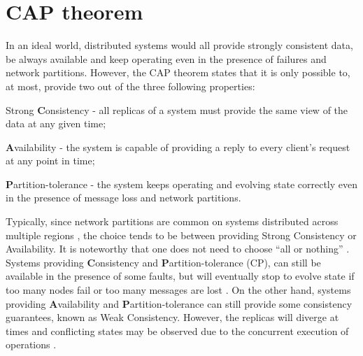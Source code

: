 

\section{CAP theorem}
\label{sec:cap}


In an ideal world, distributed systems would all provide strongly consistent data, be always available and keep operating even in the presence of failures and network partitions.
However, the CAP theorem \cite{cap} states that it is only possible to, at most, provide two out of the three following properties:
\begin{enumerate*}[label=(\roman*)]
	\item Strong \textbf{C}onsistency - all replicas of a system must provide the same view of the data at any given time;
	\item \textbf{A}vailability - the system is capable of providing a reply to every client's request at any point in time;
	\item \textbf{P}artition-tolerance - the system keeps operating and evolving state correctly even in the presence of message loss and network partitions.
\end{enumerate*}

Typically, since network partitions are common on systems distributed across multiple regions \cite{understandingEC}, the choice tends to be between providing Strong Consistency or Availability.
It is noteworthy that one does not need to choose ``all or nothing'' \cite{understandingEC}. 
Systems providing \textbf{C}onsistency and \textbf{P}artition-tolerance (CP), can still be available in the presence of some faults, but will eventually stop to evolve state if too many nodes fail or too many messages are lost \cite{cap}.
On the other hand, systems providing \textbf{A}vailability and \textbf{P}artition-tolerance can still provide some consistency guarantees, known as Weak Consistency. However, the replicas will diverge at times and conflicting states may be observed due to the concurrent execution of operations \cite{understandingEC}.

